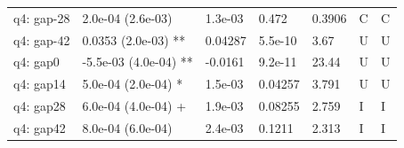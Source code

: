 {\begin{longtable}{@{}p{.245\linewidth}p{.17\linewidth}p{.17\linewidth}p{.085\linewidth}p{.060\linewidth}p{.08\linewidth}p{.07\linewidth}@{}}
q4: gap-28 & 2.0e-04 (2.6e-03) & 1.3e-03 & 0.472 & 0.3906 & C & C\\
q4: gap-42 & 0.0353 (2.0e-03) ** & 0.04287 & 5.5e-10 & 3.67 & U & U\\
q4: gap0 & -5.5e-03 (4.0e-04) ** & -0.0161 & 9.2e-11 & 23.44 & U & U\\
q4: gap14 & 5.0e-04 (2.0e-04) * & 1.5e-03 & 0.04257 & 3.791 & U & U\\
q4: gap28 & 6.0e-04 (4.0e-04) + & 1.9e-03 & 0.08255 & 2.759 & I & I\\
q4: gap42 & 8.0e-04 (6.0e-04) & 2.4e-03 & 0.1211 & 2.313 & I & I\\
\end{longtable}}
